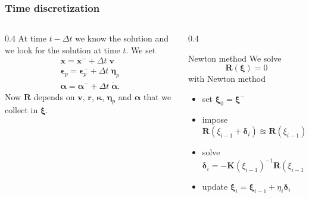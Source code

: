 \documentclass[8pt]{beamer}
\numberwithin{equation}{section}
\theoremstyle{definition}
\begin{document}
\begin{frame}
\frametitle{Time discretization}

\begin{columns}
\begin{column}{0.4\textwidth}
At time $t-\Delta t$ we know the solution and we look for the solution at time $t$. We set
\begin{gather*}
\boldsymbol{x}=\boldsymbol{x}^-+\Delta t\;\boldsymbol{v} \\
\boldsymbol{\epsilon}_p=\boldsymbol{\epsilon}_p^-+\Delta t\;\boldsymbol{\eta}_p \\
\boldsymbol{\alpha}=\boldsymbol{\alpha}^-+\Delta t\;\dot{\boldsymbol{\alpha}}.
\end{gather*}
Now $\boldsymbol{R}$ depends on $\boldsymbol{v}$, $\boldsymbol{r}$, $\boldsymbol{\kappa}$, $\boldsymbol{\eta}_p$ and $\dot{\boldsymbol{\alpha}}$ that we collect in $\boldsymbol{\xi}$.
\end{column}
\begin{column}{0.4\textwidth}
\begin{block}{Newton method}
We solve
\[
\boldsymbol{R}(\boldsymbol{\xi})=0
\]
with Newton method
\begin{itemize}
\item[-] set $\boldsymbol\xi_0=\boldsymbol\xi^-$
\item[-] impose $\boldsymbol{R}(\xi_{i-1}+\boldsymbol{\delta}_i)\approxeq\boldsymbol{R}(\xi_{i-1})+\boldsymbol{K}(\xi_{i-1})\delta_i=0$
\item[-] solve $\boldsymbol{\delta}_i=-\boldsymbol{K}(\xi_{i-1})^{-1}\boldsymbol{R}(\xi_{i-1})$
\item[-] update $\boldsymbol{\xi}_i=\boldsymbol{\xi}_{i-1}+\eta_i\boldsymbol\delta_i$
\end{itemize}
\end{block}
\end{column}
\end{columns}


\end{frame}
\end{document}
